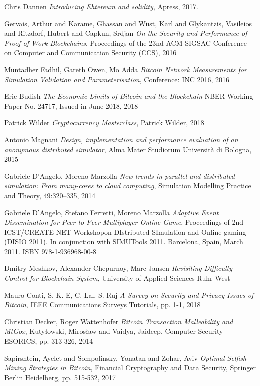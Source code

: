 \begin{thebibliography}{99}
 Chris Dannen
{\em Introducing Ehtereum and solidity},
Apress, 2017.

 Gervais, Arthur and Karame, Ghassan and Wüst, Karl and Glykantzis, Vasileios and Ritzdorf, Hubert and Capkun, Srdjan
{\em On the Security and Performance of Proof of Work Blockchains},
Proceedings of the 23nd ACM SIGSAC Conference on Computer and Communication Security (CCS), 2016

 Muntadher Fadhil, Gareth Owen, Mo Adda
{\em Bitcoin Network Measurements for Simulation Validation and Parameterisation},
Conference: INC 2016, 2016

 Eric Budish
{\em The Economic Limits of Bitcoin and the Blockchain}
NBER Working Paper No. 24717, Issued in June 2018, 2018

 Patrick Wilder
{\em Cryptocurrency Masterclass},
Patrick Wilder, 2018

 Antonio Magnani
{\em Design, implementation and performance evaluation of an anonymous distributed simulator},
Alma Mater Studiorum Università di Bologna, 2015

 Gabriele D'Angelo, Moreno Marzolla
{\em New trends in parallel and distributed simulation: From many-cores to cloud computing},
Simulation Modelling Practice and Theory, 49:320–335, 2014

 Gabriele D'Angelo, Stefano Ferretti, Moreno Marzolla
{\em Adaptive Event Dissemination for Peer-to-Peer Multiplayer Online Game},
Proceedings of 2nd ICST/CREATE-NET Workshopon DIstributed SImulation and Online gaming (DISIO 2011).
In conjunction with SIMUTools 2011. Barcelona, Spain, March 2011. ISBN 978-1-936968-00-8

 Dmitry Meshkov, Alexander Chepurnoy, Marc Jansen
{\em Revisiting Difficulty Control for Blockchain System},
University of Applied Sciences Ruhr West

 Mauro Conti, S. K. E, C. Lal, S. Ruj
{\em A Survey on Security and Privacy Issues of Bitcoin}, 
IEEE Communications Surveys Tutorials, pp. 1-1, 2018

 Christian Decker, Roger Wattenhofer
{\em Bitcoin Transaction Malleability and MtGox},
Kuty{\l}owski, Miros{\l}aw and Vaidya, Jaideep, Computer Security - ESORICS, pp. 313-326, 2014

 Sapirshtein, Ayelet and Sompolinsky, Yonatan and Zohar, Aviv
{\em Optimal Selfish Mining Strategies in Bitcoin},
Financial Cryptography and Data Security, Springer Berlin Heidelberg, pp. 515-532, 2017


\end{thebibliography}
